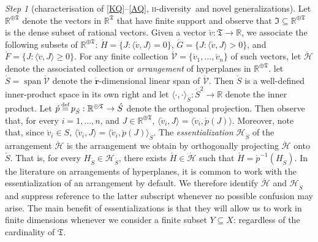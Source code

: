 \documentclass[ecta,nameyear,draft]{econsocart}
\newcommand{\R}{\mathbb R}
\newcommand{\mc}{\mathcal}
\newcommand\defeq{\mathrel{\overset{\makebox[0pt]{\mbox{\normalfont\tiny def}}}{=}}}%
\newcommand{\spann}{\operatorname{span}}
\newcommand{\mbbtpp}{{\mathfrak{T}}}
\newcommand{\mbbjpp}{\mathfrak{I}}
\newcommand{\twodiv}{\textsc{ii}-\textup{diversity}}
\theoremstyle{plain}
\theoremstyle{remark}
\newtheorem{step}{Step}[section]
\begin{document}
\begin{appendix}
\begin{step}[characterisation of \ref{KQ}–\ref{AQ}, \twodiv\ and novel
      generalizations]
    Let $\R^{\oplus\mbbtpp}$ denote the vectors in $\R^{\mbbtpp}$ that have
    finite support and observe that $\mbbjpp \subseteq \R^{\oplus\mbbtpp}$ is the
    dense subset of rational vectors.  Given a vector $\acute{v}: \mbbtpp
    \rightarrow \R$, we associate the following subsets of $\R^{\oplus\mbbtpp}$:
    $\acute H = \{J : \langle \acute v , J \rangle = 0 \}$, $\acute G = \{J :
    \langle \acute v, J \rangle > 0\}$, and $\acute F = \{J : \langle \acute v,
    J \rangle \geq 0\}$. For any finite collection $\acute{\mc V} = \{\acute{v}_1,
    \dots, \acute{v}_n\}$ of such vectors, let $\acute{\mc H}$ denote the
    associated collection or \emph{arrangement} of hyperplanes in
    $\R^{\oplus\mbbtpp}$. let $\acute{S} = \spann \acute{\mc V}$ denote the
    $\acute{\mathbf{r}}$-dimensional linear span of $\acute{\mc V}$. Then
    $\acute S$ is a well-defined inner-product space in its own right and let
    $\langle \cdot , \cdot \rangle_{\acute{S}}: \acute{S}^2 \rightarrow \R$ denote
    the inner product. Let $\acute{p} \defeq p_{\acute{S}}: \R^{\oplus\mbbtpp}
    \rightarrow \acute{S}$ denote the orthogonal projection. Then observe that,
    for every $i = 1, \dots,
    n$, and $J \in \R^{\oplus\mbbtpp}$, $\langle \acute{v}_i, J \rangle = \langle
    \acute{v}_i, \acute{p}(J)\rangle$. Moreover, note that, since $\acute{v}_i \in
    S$, $\langle \acute{v}_i, J \rangle = \langle \acute{v}_i, \acute{p}(J)
    \rangle_{\acute{S}}$.  The \emph{essentialization} ${\mc H}_{\acute{S}}$ of
    the arrangement $\acute{\mc H}$ is the arrangement we obtain by orthogonally
    projecting $\acute{\mc H}$ onto $\acute{S}$.  That is, for every $H_{\acute{S}}
    \in {\mc H}_{\acute{S}}$, there exists $\acute{H} \in \acute{\mc H}$ such that
    $\acute{H} = \acute{p}^{-1}(H_{\acute{S}})$.  In the literature on
    arrangements of hyperplanes, it is common to work with the essentialization
    of an arrangement by default.  We therefore identify $\acute{\mc H}$ and
    $\mc{H}_{\acute{S}}$ and suppress reference to the latter subscript
    whenever no possible confusion may arise. The main benefit of
    essentializations is that they will allow us to work in finite dimensions
    whenever we consider a finite subset $Y\subseteq X$: regardless of the
    cardinality of $\mbbtpp$.

\end{step}
\end{appendix}
\end{document}
